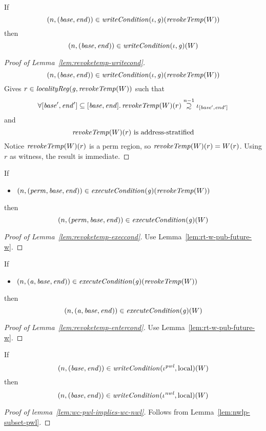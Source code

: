 \documentclass[a4paper]{article}
\newcommand\supsetsim{\mathrel{\ooalign{\raise.2ex\hbox{$\supset$}\cr
      \hidewidth\lower.8ex\hbox{\scalebox{0.9}{$\sim$}}\hidewidth\cr}}}
\newcommand{\nsupsim}[1][n]{\stackrel{\tiny{#1}}{\supsetsim}}
\newcommand{\var}[1]{\mathit{#1}}
\newcommand{\gl}{\var{g}}
\newcommand{\addr}{\var{a}}
\newcommand{\start}{\var{base}}
\newcommand{\addrend}{\var{end}}
\newcommand{\perm}{\var{perm}}
\newcommand{\nwl}{\var{nwl}}
\newcommand{\pwl}{\var{pwl}}
\newcommand{\plainfun}[2]{
  \ifthenelse{\equal{#2}{}}
  {\mathit{#1}}
  {\mathit{#1}(#2)}
}
\newcommand{\writeCond}[1]{\plainfun{writeCondition}{#1}}
\newcommand{\execCond}[1]{\plainfun{executeCondition}{#1}}
\newcommand{\revokeTemp}[1]{\plainfun{revokeTemp}{#1}}
\newcommand{\npair}[2][n]{\left(#1,#2 \right)}
\newcommand{\plainperm}[1]{\mathrm{#1}}
\newcommand{\local}{\plainperm{local}}
\newcommand{\localityReg}{\var{localityReg}}
\newcommand{\plainview}[1]{\mathrm{#1}}
\newcommand{\perma}{\plainview{perm}}
\begin{document}
\begin{lemma}
  \label{lem:revoketemp-writecond}
  If
  \[
    \npair{(\start,\addrend)} \in \writeCond{}(\iota,\gl)(\revokeTemp{W})
  \]
  then
  \[
    \npair{(\start,\addrend)} \in \writeCond{}(\iota,\gl)(W)
  \]
\end{lemma}
\begin{proof}[Proof of Lemma~\ref{lem:revoketemp-writecond}]
  \[
    \npair{(\start,\addrend)} \in \writeCond{}(\iota,\gl)(\revokeTemp{W})
  \]
  Gives $r \in \localityReg(\gl,\revokeTemp{W})$ such that
  \[
    \forall [\start',\addrend'] \subseteq [\start,\addrend] \ldotp \revokeTemp{W}(r) \nsupsim[n-1] \iota_{[\start',\addrend']}
  \]
  and 
  \begin{equation*}
    \revokeTemp{W}(r) \text{ is address-stratified}
  \end{equation*}
  Notice $\revokeTemp{W}(r)$ is a $\perma$ region, so $\revokeTemp{W}(r) = W(r)$. Using $r$ as witness, the result is immediate.
\end{proof}

\begin{lemma}
  \label{lem:revoketemp-execcond}
  If
  \begin{itemize}
  \item $\npair{(\perm,\start,\addrend)} \in \execCond{}(\gl)(\revokeTemp{W})$
  \end{itemize}
  then
  \[
    \npair{(\perm,\start,\addrend)} \in \execCond{}(\gl)(W)
  \]
\end{lemma}
\begin{proof}[Proof of Lemma~\ref{lem:revoketemp-execcond}]
  Use Lemma~\ref{lem:rt-w-pub-future-w}.
\end{proof}

\begin{lemma}
  \label{lem:revoketemp-entercond}
  If
  \begin{itemize}
  \item $\npair{(\addr,\start,\addrend)} \in \execCond{}(\gl)(\revokeTemp{W})$
  \end{itemize}
  then
  \[
    \npair{(\addr,\start,\addrend)} \in \execCond{}(\gl)(W)
  \]
\end{lemma}
\begin{proof}[Proof of Lemma~\ref{lem:revoketemp-entercond}]
    Use Lemma~\ref{lem:rt-w-pub-future-w}.
\end{proof}

\begin{lemma}
  \label{lem:wc-pwl-implies-wc-nwl}
  If
  \[
    \npair{(\start,\addrend)} \in \writeCond{}(\iota^\pwl,\local)(W)
  \]
  then
  \[
    \npair{(\start,\addrend)} \in \writeCond{}(\iota^\nwl,\local)(W)
  \]
\end{lemma}
\begin{proof}[Proof of lemma~\ref{lem:wc-pwl-implies-wc-nwl}]
  Follows from Lemma~\ref{lem:nwlp-subset-pwl}.
\end{proof}
\end{document}
